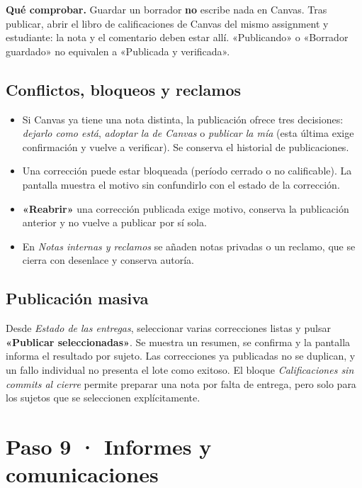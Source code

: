 \documentclass[11pt,a4paper]{article}
\newenvironment{comprobar}
  {\def\FrameCommand{\fcolorbox{verde}{verdefondo}}\MakeFramed{\advance\hsize-\width\FrameRestore}\noindent\textbf{\textcolor{verde}{Qué comprobar.}} }
  {\endMakeFramed}
\newcommand{\ui}[1]{\textbf{«#1»}}        %
\begin{document}
\begin{comprobar}
Guardar un borrador \textbf{no} escribe nada en Canvas. Tras publicar, abrir el libro de calificaciones de Canvas del mismo assignment y estudiante: la nota y el comentario deben estar allí. «Publicando» o «Borrador guardado» no equivalen a «Publicada y verificada».
\end{comprobar}

\subsection{Conflictos, bloqueos y reclamos}

\begin{itemize}
  \item Si Canvas ya tiene una nota distinta, la publicación ofrece tres decisiones: \emph{dejarlo como está}, \emph{adoptar la de Canvas} o \emph{publicar la mía} (esta última exige confirmación y vuelve a verificar). Se conserva el historial de publicaciones.
  \item Una corrección puede estar bloqueada (período cerrado o no calificable). La pantalla muestra el motivo sin confundirlo con el estado de la corrección.
  \item \ui{Reabrir} una corrección publicada exige motivo, conserva la publicación anterior y no vuelve a publicar por sí sola.
  \item En \emph{Notas internas y reclamos} se añaden notas privadas o un reclamo, que se cierra con desenlace y conserva autoría.
\end{itemize}

\subsection{Publicación masiva}

Desde \emph{Estado de las entregas}, seleccionar varias correcciones listas y pulsar \ui{Publicar seleccionadas}. Se muestra un resumen, se confirma y la pantalla informa el resultado por sujeto. Las correcciones ya publicadas no se duplican, y un fallo individual no presenta el lote como exitoso. El bloque \emph{Calificaciones sin commits al cierre} permite preparar una nota por falta de entrega, pero solo para los sujetos que se seleccionen explícitamente.

\section{Paso 9 · Informes y comunicaciones}
\end{document}
